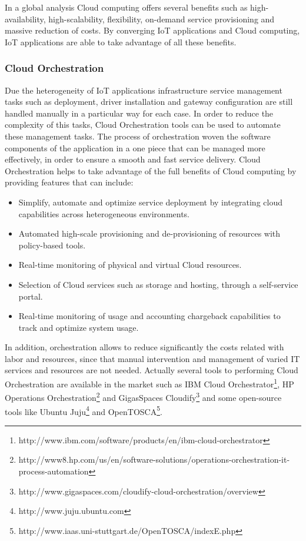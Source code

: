 In a global analysis Cloud computing offers several benefits such as high-availability, high-scalability, flexibility, on-demand service provisioning and massive reduction of costs. By converging IoT applications and Cloud computing, IoT applications are able to take advantage
of all these benefits.
\subsubsection{Cloud Orchestration}
\label{subs:cloud_orchestration}
Due the heterogeneity of IoT applications infrastructure service management tasks such as deployment, driver installation and gateway configuration are still handled manually in a particular way for each case.
In order to reduce the complexity of this tasks, Cloud Orchestration tools can be used to automate these management tasks. The process of orchestration woven the software components of the application
in a one piece that can be managed more effectively, in order to ensure a smooth and fast service delivery. Cloud Orchestration helps to take advantage of the full benefits of Cloud computing by providing features that can include:
\begin{itemize}
  \item Simplify, automate and optimize service deployment by integrating cloud capabilities across heterogeneous environments.
  \item Automated high-scale provisioning and de-provisioning of resources with policy-based tools.
  \item Real-time monitoring of physical and virtual Cloud resources.
  \item Selection of Cloud services such as storage and hosting, through a self-service portal.
  \item Real-time monitoring of usage and accounting chargeback capabilities to track and optimize system usage.
\end{itemize}
In addition, orchestration allows to reduce significantly the costs related with labor and resources, since that manual intervention and management of varied IT services and resources are not needed. Actually several tools to
performing Cloud Orchestration are available in the market such as IBM Cloud Orchestrator\footnote{http://www.ibm.com/software/products/en/ibm-cloud-orchestrator}, HP Operations Orchestration\footnote{http://www8.hp.com/us/en/software-solutions/operations-orchestration-it-process-automation}
and GigasSpaces Cloudify\footnote{http://www.gigaspaces.com/cloudify-cloud-orchestration/overview} and some open-source tools like Ubuntu Juju\footnote{http://www.juju.ubuntu.com} and OpenTOSCA\footnote{http://www.iaas.uni-stuttgart.de/OpenTOSCA/indexE.php}.\\

